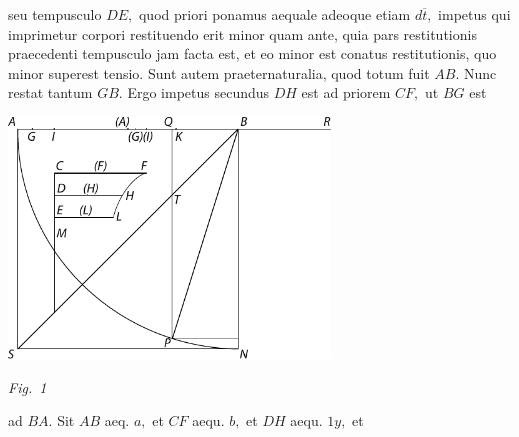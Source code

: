 seu tempusculo $DE,$\protect{}
quod priori ponamus aequale adeoque etiam $d\overline{t},$
impetus\protect{}
qui imprimetur corpori restituendo\protect{}
erit minor quam ante,
quia pars restitutionis\protect{}
praecedenti tempusculo\protect{} jam facta est,
et eo minor est conatus restitutionis,\protect{}
quo minor superest tensio.\protect{}
Sunt autem
praeternaturalia,\protect{}
quod totum fuit $AB.$
Nunc restat tantum $GB.$
Ergo impetus secundus\protect{}
$DH$ est ad priorem $CF,$
ut $BG$ est
\pend
\newpage
  \centerline{\includegraphics[width=0.64\textwidth]{gesamttex/edit_VIII,3/images/LH_35_09_15_002-005_d1.pdf}}%
  \vspace{0.5em}
  \centerline{\lbrack\textit{Fig.~1}\rbrack}%
  \label{LH_35_09_15_002r_fig.1}%
%
 \vspace{1.5em}%
\pstart
\noindent ad $BA.$
Sit $AB$ aeq. $a,$
et $CF$ aequ. $b,$
et $DH$ aequ.
$\scriptstyle{\textit{1}}\displaystyle{y},$
et  %
